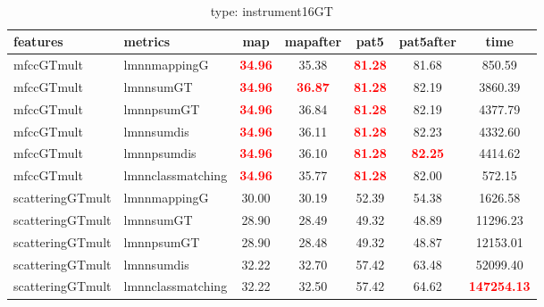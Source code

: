   
\begin{table} 
\begin{center} 
\ 
 \setlength{\tabcolsep}{.16667em} 
\begin{tabular}{llccccc} 
features & metrics & map & mapafter & pat5 & pat5after & time \\ 
\hline 
mfccGTmult & lmnnmappingG & \textbf{\textcolor{red}{34.96}} & 35.38 & \textbf{\textcolor{red}{81.28}} & 81.68 &    850.59 \\ 
mfccGTmult & lmnnsumGT & \textbf{\textcolor{red}{34.96}} & \textbf{\textcolor{red}{36.87}} & \textbf{\textcolor{red}{81.28}} & 82.19 &   3860.39 \\ 
mfccGTmult & lmnnpsumGT & \textbf{\textcolor{red}{34.96}} & 36.84 & \textbf{\textcolor{red}{81.28}} & 82.19 &   4377.79 \\ 
mfccGTmult & lmnnsumdis & \textbf{\textcolor{red}{34.96}} & 36.11 & \textbf{\textcolor{red}{81.28}} & 82.23 &   4332.60 \\ 
mfccGTmult & lmnnpsumdis & \textbf{\textcolor{red}{34.96}} & 36.10 & \textbf{\textcolor{red}{81.28}} & \textbf{\textcolor{red}{82.25}} &   4414.62 \\ 
mfccGTmult & lmnnclassmatching & \textbf{\textcolor{red}{34.96}} & 35.77 & \textbf{\textcolor{red}{81.28}} & 82.00 &    572.15 \\ 
scatteringGTmult & lmnnmappingG & 30.00 & 30.19 & 52.39 & 54.38 &   1626.58 \\ 
scatteringGTmult & lmnnsumGT & 28.90 & 28.49 & 49.32 & 48.89 &  11296.23 \\ 
scatteringGTmult & lmnnpsumGT & 28.90 & 28.48 & 49.32 & 48.87 &  12153.01 \\ 
scatteringGTmult & lmnnsumdis & 32.22 & 32.70 & 57.42 & 63.48 &  52099.40 \\ 
scatteringGTmult & lmnnclassmatching & 32.22 & 32.50 & 57.42 & 64.62 & \textbf{\textcolor{red}{147254.13}} \\ 
\end{tabular} 
\end{center} 
\caption{type: instrument16GT} 
\label{me} 
\end{table} 
 
